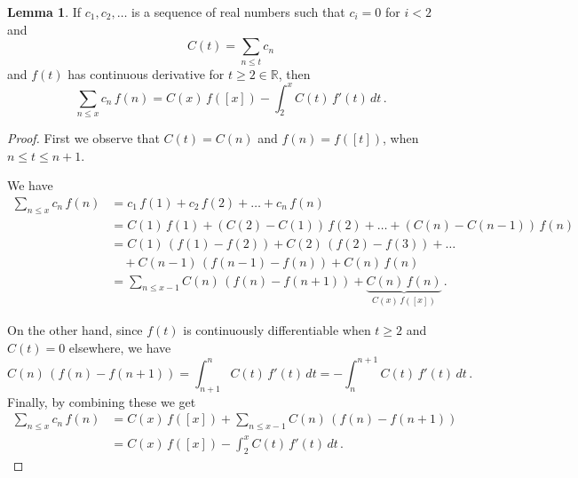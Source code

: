 \documentclass{article}
\theoremstyle{definition}
\newtheorem{lemma}[subsubsection]{Lemma}
\begin{document}
\begin{lemma}
\label{lemma:mertenapu}
If $c_1, c_2,\dots$ is a sequence of real numbers such that $c_i=0$ for $i<2$ and
\begin{equation*}
    C(t) = \sum_{n\leq t} c_n
\end{equation*}
and $f(t)$ has continuous derivative for $t \geq 2 \in \mathbb{R}$, then
\begin{equation*}
    \sum_{n\leq x} c_n\,f(n) = C(x)\,f([x])-\int_2^x C(t)\,f'(t)\,dt\,.
\end{equation*}

\begin{proof}
First we observe that $C(t) = C(n)$ and $f(n)=f([t])$, when $n\leq t\leq n+1$.

We have
\begin{align*}
    \sum_{n\leq x} c_n\,f(n) & = c_1\,f(1) + c_2\,f(2) + \dots + c_n\,f(n)\\
    & =  C(1)\,f(1) + (C(2)-C(1))\,f(2) + \dots + (C(n)-C(n-1))\,f(n)\\
    & = C(1)\,(f(1)-f(2)) + C(2)\,(f(2)-f(3)) + \dots\\
    & \quad + C(n-1)\,(f(n-1)-f(n)) + C(n)\,f(n)\\
    & = \sum_{n\leq x-1} C(n)\,(f(n)-f(n+1)) + \underbrace{C(n)\,f(n)}_\text{$C(x)\,f([x])$}\,.
\end{align*}

On the other hand, since $f(t)$ is continuously differentiable when $t\geq2$ and $C(t)=0$ elsewhere, we have
\begin{equation*}
     C(n)\,(f(n)-f(n+1)) = \int_{n+1}^n C(t)\,f'(t)\,dt = -\int_n^{n+1} C(t)\,f'(t)\,dt\,.
\end{equation*}
Finally, by combining these we get
\begin{align*}
    \sum_{n\leq x} c_n\,f(n) & = C(x)\,f([x]) + \sum_{n\leq x-1} C(n)\,(f(n)-f(n+1))\\
    & = C(x)\,f([x])-\int_2^x C(t)\,f'(t)\,dt\,.
\end{align*}

\end{proof}
\end{lemma}
\end{document}
